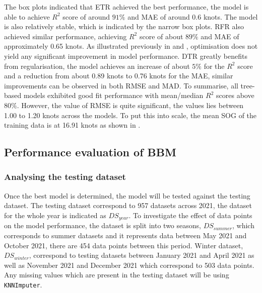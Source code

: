 The box plots indicated that ETR achieved the best performance, the model is able to achieve $R^2$ score of around $91\%$ and MAE of around 0.6 knots. The model is also relatively stable, which is indicated by the narrow box plots. RFR also achieved similar performance, achieving $R^2$ score of about $89\%$ and MAE of approximately 0.65 knots. As illustrated previously in  and , optimisation does not yield any significant improvement in model performance. DTR greatly benefits from regularisation, the model achieves an increase of about $5\%$ for the $R^2$ score and a reduction from about 0.89 knots to 0.76 knots for the MAE, similar improvements can be observed in both RMSE and MAD. To summarise, all tree-based models exhibited good fit performance with mean/median $R^2$ scores above $80\%$. However, the value of RMSE is quite significant, the values lies between 1.00 to 1.20 knots across the models. To put this into scale, the mean SOG of the training data is at 16.91 knots as shown in .\\  

\subsection{Performance evaluation of BBM}\label{sec:Perf_eval_BBM}

\subsubsection{Analysing the testing dataset}\label{sec:testing_data_analysis}

Once the best model is determined, the model will be tested against the testing dataset. The testing dataset correspond to 957 datasets across 2021, the dataset for the whole year is indicated as $DS_{year}$. To investigate the effect of data points on the model performance, the dataset is split into two seasons, $DS_{summer}$, which corresponds to summer datasets and it represents data between May 2021 and October 2021, there are 454 data points between this period. Winter dataset, $DS_{winter}$, correspond to testing datasets between January 2021 and April 2021 as well as November 2021 and December 2021 which correspond to 503 data points. Any missing values which are present in the testing dataset will be using {\tt KNNImputer}.\\

